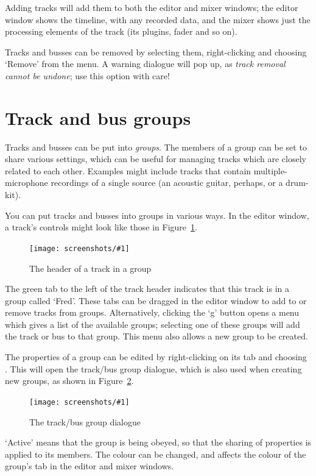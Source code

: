\documentclass[10pt,a4paper]{book}
\newcommand{\menu}[1]{\emph{\StrSubstitute{#1}{,}{ $\rightarrow$ }}}
\newcommand{\screenshot}[3]{%
\begin{figure}[ht]%
\begin{center}
\texttt{[image: screenshots/\#1]}
\end{center}
\caption{#2}
\label{#3}
\end{figure}}
\begin{document}
Adding tracks will add them to both the editor and mixer windows; the
editor window shows the timeline, with any recorded data, and the
mixer shows just the processing elements of the track (its plugins,
fader and so on).

Tracks and busses can be removed by selecting them, right-clicking and
choosing `Remove' from the menu.  A warning dialogue will pop up, as
\emph{track removal cannot be undone}; use this option with care!


\section{Track and bus groups}
\label{sec:track-and-bus-groups}

Tracks and busses can be put into \emph{groups}. The members of a
group can be set to share various settings, which can be useful for
managing tracks which are closely related to each other.  Examples
might include tracks that contain multiple-microphone recordings of a
single source (an acoustic guitar, perhaps, or a drum-kit).

You can put tracks and busses into groups in various ways.  In the
editor window, a track's controls might look like those in
Figure~\ref{fig:track-in-group}.

\screenshot{track-in-group.png}{The header of a track in a group}{fig:track-in-group}

The green tab to the left of the track header indicates that this
track is in a group called `Fred'.  These tabs can be dragged in the
editor window to add to or remove tracks from groups.  Alternatively,
clicking the `g' button opens a menu which gives a list of the
available groups; selecting one of these groups will add the track or
bus to that group.  This menu also allows a new group to be created.

The properties of a group can be edited by right-clicking on its tab
and choosing \menu{Edit Group...}.  This will open the track/bus group
dialogue, which is also used when creating new groups, as shown in
Figure~\ref{fig:route-group-dialogue}.

\screenshot{route-group-dialogue.png}{The track/bus group dialogue}{fig:route-group-dialogue}

`Active' means that the group is being obeyed, so that the sharing of
properties is applied to its members.  The colour can be changed, and
affects the colour of the group's tab in the editor and mixer windows.
\end{document}
